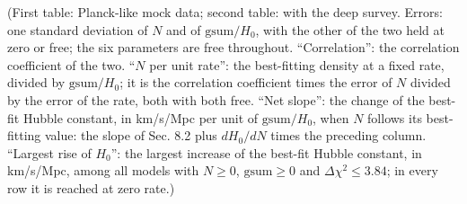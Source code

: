 \documentclass[
  10pt,
]{article}
\begin{document}
(First table: Planck-like mock data; second table: with the deep survey.
Errors: one standard deviation of \(N\) and of \(\mathrm{gsum}/H_0\),
with the other of the two held at zero or free; the six parameters are
free throughout. ``Correlation'': the correlation coefficient of the
two. ``\(N\) per unit rate'': the best-fitting density at a fixed rate,
divided by \(\mathrm{gsum}/H_0\); it is the correlation coefficient
times the error of \(N\) divided by the error of the rate, both with
both free. ``Net slope'': the change of the best-fit Hubble constant, in
km/s/Mpc per unit of \(\mathrm{gsum}/H_0\), when \(N\) follows its
best-fitting value: the slope of Sec. 8.2 plus \(dH_0/dN\) times the
preceding column. ``Largest rise of \(H_0\)'': the largest increase of
the best-fit Hubble constant, in km/s/Mpc, among all models with
\(N\ge0\), \(\mathrm{gsum}\ge0\) and \(\Delta\chi^2\le3.84\); in every
row it is reached at zero rate.)
\end{document}
